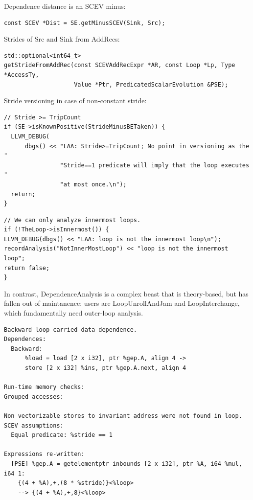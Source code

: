 \documentclass{beamer}
\begin{document}
\begin{frame}[containsverbatim]
  Dependence distance is an SCEV minus:
  \begin{verbatim}
const SCEV *Dist = SE.getMinusSCEV(Sink, Src);
  \end{verbatim}
  \vspace{2em}
  Strides of Src and Sink from AddRecs:
  \begin{verbatim}
std::optional<int64_t>
getStrideFromAddRec(const SCEVAddRecExpr *AR, const Loop *Lp, Type *AccessTy,
                    Value *Ptr, PredicatedScalarEvolution &PSE);
  \end{verbatim}
  \vspace{2em}
  Stride versioning in case of non-constant stride:
  \begin{verbatim}
// Stride >= TripCount
if (SE->isKnownPositive(StrideMinusBETaken)) {
  LLVM_DEBUG(
      dbgs() << "LAA: Stride>=TripCount; No point in versioning as the "
                "Stride==1 predicate will imply that the loop executes "
                "at most once.\n");
  return;
}
  \end{verbatim}
\end{frame}

\begin{frame}[containsverbatim]
  \begin{verbatim}
// We can only analyze innermost loops.
if (!TheLoop->isInnermost()) {
LLVM_DEBUG(dbgs() << "LAA: loop is not the innermost loop\n");
recordAnalysis("NotInnerMostLoop") << "loop is not the innermost loop";
return false;
}
\end{verbatim}

  \vspace{1em}

  In contrast, DependenceAnalysis is a complex beast that is theory-based, but has fallen out of maintanence: users are LoopUnrollAndJam and LoopInterchange, which fundamentally need outer-loop analysis.
\end{frame}

\begin{frame}[containsverbatim]
  \begin{adjustwidth}{-1em}{-1em}
    \begin{verbatim}
Backward loop carried data dependence.
Dependences:
  Backward:
      %load = load [2 x i32], ptr %gep.A, align 4 ->
      store [2 x i32] %ins, ptr %gep.A.next, align 4

Run-time memory checks:
Grouped accesses:

Non vectorizable stores to invariant address were not found in loop.
SCEV assumptions:
  Equal predicate: %stride == 1

Expressions re-written:
  [PSE] %gep.A = getelementptr inbounds [2 x i32], ptr %A, i64 %mul, i64 1:
    {(4 + %A),+,(8 * %stride)}<%loop>
    --> {(4 + %A),+,8}<%loop>
    \end{verbatim}
  \end{adjustwidth}
\end{frame}
\end{document}
